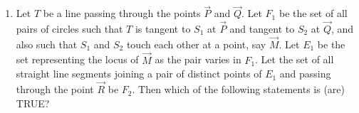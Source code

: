 \documentclass[journal,12pt,twocolumn]{IEEEtran}
\theoremstyle{remark}
\begin{document}
\begin{enumerate}
\hfill {}
\begin{enumerate}
\end{enumerate}
\item Let $T$ be a line passing through the points $\vec{P}$ and $\vec{Q}$. Let $F_1$ be the set of all pairs of circles  such that $T$ is tangent to $S_1$ at $\vec{P}$ and tangent to $S_2$ at $\vec{Q}$, and also such that $S_1$ and $S_2$ touch each other at a point, say $\vec{M}$. Let $E_1$ be the set representing the locus of $\vec{M}$ as the pair  varies in $F_1$. Let the set of all straight line segments joining a pair of distinct points of $E_1$ and passing through the point $\vec{R}$ be $F_2$. Then which of the following statements is (are) TRUE?

\hfill{}
\begin{enumerate}
\end{enumerate}
\end{enumerate}
\end{document}
